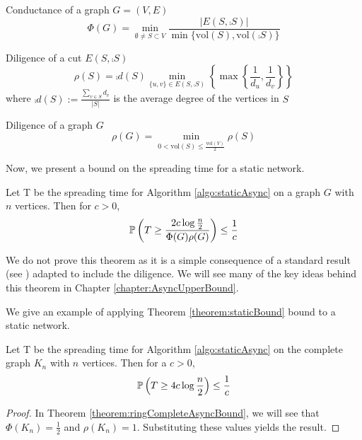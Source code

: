 
\begin{definition}
	Conductance of a graph $G = (V, E)$
	$$
		\Phi(G) = \min_{\emptyset \neq S \subset V} \frac{|E(S, \comp{S})|}{\min\{\text{vol}(S), \text{vol}(\comp{S})\}}
	$$
\end{definition}


\begin{definition}
	Diligence of a cut $ E(S, \comp{S}) $
	$$
		\rho(S) = \comp{d}(S) \min_{\{u, v\} \in E(S, \comp{S}) } \left\{ \max \left\{ \frac{1}{d_u},\frac{1}{d_v} \right\} \right\}
	$$ 
	where $\comp{d}(S) := \frac{\sum_{v \in S} d_v}{|S|}$ is the average degree of the vertices in $S$
\end{definition}


\begin{definition}
	Diligence of a graph $G$
	$$
		\rho(G) = \min_{0 < \text{vol}(S) \leq \frac{\text{vol}(V)}{2}} \rho(S) 
	$$
\end{definition}

Now, we present a bound on the spreading time for a static network.
\begin{theorem}\label{theorem:staticBound}
	Let T be the spreading time for Algorithm \ref{algo:staticAsync} on a graph $G$ with $n$ vertices. Then for $c > 0$,
	$$
		\mathbb{P}\left( T \geq \frac{2c \log \frac{n}{2}}{\Phi(G)\rho(G)}\right) \leq \frac{1}{c}
	$$
\end{theorem}

We do not prove this theorem as it is a simple consequence of a standard result (see \cite{complexNetworksRumourSpreading}) adapted to include the diligence. We will see many of the key ideas behind this theorem in Chapter \ref{chapter:AsyncUpperBound}.

We give an example of applying Theorem \ref{theorem:staticBound} bound to a static network.


\begin{theorem}
	Let T be the spreading time for Algorithm \ref{algo:staticAsync} on the complete graph $K_n$ with $n$ vertices. Then for a $c > 0$,
	$$
		\mathbb{P}\left( T \geq 4c \log \frac{n}{2} \right) \leq \frac{1}{c} 
	$$
\end{theorem}

\begin{proof}
	In Theorem \ref{theorem:ringCompleteAsyncBound}, we will see that $\Phi(K_n) = \frac{1}{2}$ and $\rho(K_n) = 1$. Substituting these values yields the result.
\end{proof}


